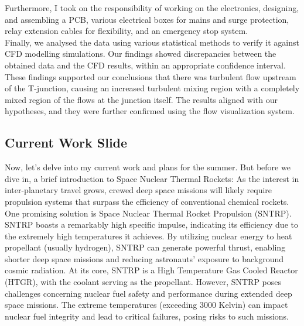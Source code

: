 \documentclass[8pt,a5paper]{article}
\begin{document}
Furthermore, I took on the responsibility of working on the electronics, designing, and assembling a PCB, various electrical boxes for mains and surge protection, relay extension cables for flexibility, and an emergency stop system.\\

Finally, we analysed the data using various statistical methods to verify it against CFD modelling simulations. Our findings showed discrepancies between the obtained data and the CFD results, within an appropriate confidence interval. These findings supported our conclusions that there was turbulent flow upstream of the T-junction, causing an increased turbulent mixing region with a completely mixed region of the flows at the junction itself. The results aligned with our hypotheses, and they were further confirmed using the flow visualization system.

\subsection*{Current Work Slide}

Now, let's delve into my current work and plans for the summer. But before we dive in, a brief introduction to Space Nuclear Thermal Rockets:
As the interest in inter-planetary travel grows, crewed deep space missions will likely require propulsion systems that surpass the efficiency of conventional chemical rockets. One promising solution is Space Nuclear Thermal Rocket Propulsion (SNTRP). SNTRP boasts a remarkably high specific impulse, indicating its efficiency due to the extremely high temperatures it achieves. By utilizing nuclear energy to heat propellant (usually hydrogen), SNTRP can generate powerful thrust, enabling shorter deep space missions and reducing astronauts' exposure to background cosmic radiation. At its core, SNTRP is a High Temperature Gas Cooled Reactor (HTGR), with the coolant serving as the propellant. However, SNTRP poses challenges concerning nuclear fuel safety and performance during extended deep space missions. The extreme temperatures (exceeding 3000 Kelvin) can impact nuclear fuel integrity and lead to critical failures, posing risks to such missions.\\
\end{document}
